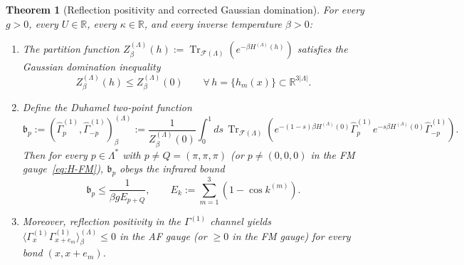 \documentclass[11pt]{article}
\newtheorem{theorem}{Theorem}[section]
\theoremstyle{definition}
\theoremstyle{remark}
\DeclareMathOperator{\Tr}{Tr}
\newcommand{\calF}{\mathcal{F}}
\newcommand{\bbR}{\mathbb{R}}
\begin{document}
\begin{theorem}[Reflection positivity and corrected Gaussian domination]\label{thm:rp-gd}
For every $g > 0$, every $U \in \bbR$, every $\kappa \in \bbR$, and every inverse temperature $\beta > 0$:
\begin{enumerate}[label=\arabic*.,leftmargin=2em]
\item The partition function $Z_\beta^{(\Lambda)}(h) := \Tr_{\calF(\Lambda)}\!\left(e^{-\beta H^{(\Lambda)}(h)}\right)$ satisfies the Gaussian domination inequality
\begin{equation}\label{eq:gd-Z}
Z_\beta^{(\Lambda)}(h) \le Z_\beta^{(\Lambda)}(0) \qquad \forall\, h = \{h_m(x)\} \subset \bbR^{3|\Lambda|}.
\end{equation}
\item Define the Duhamel two-point function
\begin{equation}\label{eq:bp-def}
\mathfrak{b}_p := (\hat{\Gamma}_p^{(1)}, \hat{\Gamma}_{-p}^{(1)})_\beta^{(\Lambda)} := \frac{1}{Z_\beta^{(\Lambda)}(0)} \int_0^1 ds\, \Tr_{\calF(\Lambda)}\!\left(e^{-(1-s)\beta H^{(\Lambda)}(0)} \hat{\Gamma}_p^{(1)} e^{-s\beta H^{(\Lambda)}(0)} \hat{\Gamma}_{-p}^{(1)}\right).
\end{equation}
Then for every $p \in \Lambda^*$ with $p \ne Q = (\pi, \pi, \pi)$ (or $p \ne (0,0,0)$ in the FM gauge~\eqref{eq:H-FM}), $\mathfrak{b}_p$ obeys the infrared bound
\begin{equation}\label{eq:gd-bp}
\mathfrak{b}_p \le \frac{1}{\beta g E_{p+Q}}, \qquad E_k := \sum_{m=1}^3 \left(1 - \cos k^{(m)}\right).
\end{equation}
\item Moreover, reflection positivity in the $\Gamma^{(1)}$ channel yields $\langle \Gamma_x^{(1)}\Gamma_{x+e_m}^{(1)} \rangle_\beta^{(\Lambda)} \le 0$ in the AF gauge (or $\ge 0$ in the FM gauge) for every bond $(x, x+e_m)$.
\end{enumerate}
\end{theorem}
\end{document}

